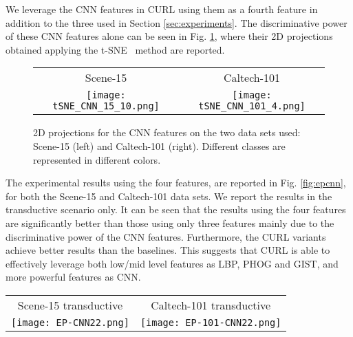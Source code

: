 \documentclass[journal,11pt]{IEEEtran}
\begin{document}
We leverage the CNN features in CURL using them as a fourth feature in addition to the three used in Section \ref{sec:experiments}. The discriminative power of these CNN features alone can be seen in Fig. \ref{fig:tsneCNN}, where their 2D projections obtained applying the t-SNE~\cite{van2008visualizing} method are reported. 

\begin{figure}[tbp]%
\centering
\begin{tabular}{cc}
\footnotesize{Scene-15} & \footnotesize{Caltech-101}\\
\texttt{[image: tSNE\_CNN\_15\_10.png]} &
\texttt{[image: tSNE\_CNN\_101\_4.png]} \\
\end{tabular}
\caption{2D projections for the CNN features on the two data sets used: Scene-15 (left) and Caltech-101 (right). Different classes are represented in different colors.}%
\label{fig:tsneCNN}%
\end{figure}

The experimental results using the four features, are reported in Fig. \ref{fig:epcnn}, for both the Scene-15 and Caltech-101 data sets. We report the results in the transductive scenario only. It can be seen that the results using the four features are significantly better than those using only three features mainly due to the discriminative power of the CNN features. Furthermore, the CURL variants achieve better results than the baselines. This suggests that CURL is able to effectively leverage both low/mid level features as LBP, PHOG and GIST, and  more powerful features as CNN.

\begin{figure*}[ht]%
\centering
\begin{tabular}{cc}
\footnotesize{Scene-15 transductive} & \footnotesize{Caltech-101 transductive}\\
\texttt{[image: EP-CNN22.png]} &
\texttt{[image: EP-101-CNN22.png]} \\
\end{tabular}
\caption{Mean Average Precision (MAP) varying the number of labeled images per class, obtained on the Scene-15 data set (left), and on the Caltech-101
data set (right). Results are obtained using GIST, PHOG, LBP and CNN features.}
\label{fig:epcnn}
\end{figure*}
\end{document}
